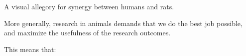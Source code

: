 \documentclass{tufte-book}
\begin{document}
\begin{marginfigure}
\caption{A visual allegory for synergy between humans and rats.}
\label{fig:rat-mask}
\end{marginfigure}

More generally, research in animals demands that we do the best job
possible, and maximize the usefulness of the research outcomes.

This means that:
\end{document}
